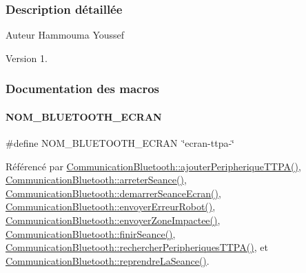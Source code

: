\subsubsection{Description détaillée}
\begin{DoxyAuthor}{Auteur}
Hammouma Youssef
\end{DoxyAuthor}
\begin{DoxyVersion}{Version}
1. 
\end{DoxyVersion}


\subsubsection{Documentation des macros}
\mbox{\label{terminal-_t_t_p_a_2communicationbluetooth_8h_a2bd8beaaf0c4b59979a3f78d4c134ec8}} 
\paragraph{\texorpdfstring{N\+O\+M\+\_\+\+B\+L\+U\+E\+T\+O\+O\+T\+H\+\_\+\+E\+C\+R\+AN}{NOM\_BLUETOOTH\_ECRAN}}
{\footnotesize\ttfamily \#define N\+O\+M\+\_\+\+B\+L\+U\+E\+T\+O\+O\+T\+H\+\_\+\+E\+C\+R\+AN~\char`\"{}ecran-\/ttpa-\/\char`\"{}}



Référencé par \hyperlink{class_communication_bluetooth_a53bc4772892ec57f030600e49fa0b6ff}{Communication\+Bluetooth\+::ajouter\+Peripherique\+T\+T\+P\+A()}, \hyperlink{class_communication_bluetooth_a4b0e71c1f161c14278f3ab55b1910c64}{Communication\+Bluetooth\+::arreter\+Seance()}, \hyperlink{class_communication_bluetooth_a024493f537e8501a813e1555716cf7ad}{Communication\+Bluetooth\+::demarrer\+Seance\+Ecran()}, \hyperlink{class_communication_bluetooth_a891295407273a810ef9300e743bc34f9}{Communication\+Bluetooth\+::envoyer\+Erreur\+Robot()}, \hyperlink{class_communication_bluetooth_a5906cd18db7ce9467452acf0ed845f23}{Communication\+Bluetooth\+::envoyer\+Zone\+Impactee()}, \hyperlink{class_communication_bluetooth_ab2170ef9c868ac2a26b76675c71f770e}{Communication\+Bluetooth\+::finir\+Seance()}, \hyperlink{class_communication_bluetooth_a4c2e2d557728c227faeb247cb8a9c482}{Communication\+Bluetooth\+::rechercher\+Peripheriques\+T\+T\+P\+A()}, et \hyperlink{class_communication_bluetooth_a1bcf85f34d2902ba6fe3b6929b409272}{Communication\+Bluetooth\+::reprendre\+La\+Seance()}.


